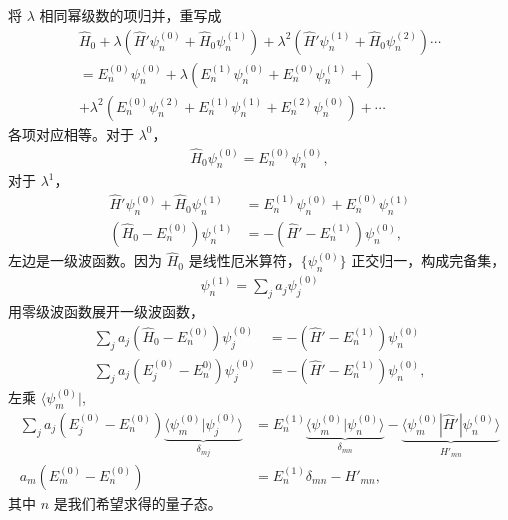 将 $\lambda$ 相同幂级数的项归并，重写成
\begin{multline}
    \hat H_0 + \lambda \left(
        \hat H' \psi_n^{(0)} + \hat H_0 \psi_n^{(1)}
    \right) + \lambda^2 \left(
        \hat H' \psi_n^{(1)} + \hat H_0 \psi_n^{(2)}
    \right) \cdots \\ = 
    E_n^{(0)} \psi_n^{(0)} + \lambda \left(
        E_n^{(1)} \psi_n^{(0)} + E_n^{(0)} \psi_n^{(1)} + 
    \right) 
    \\+ \lambda^2 \left(
        E_n^{(0)} \psi_n^{(2)} +E_n^{(1)} \psi_n^{(1)} + E_n^{(2)} \psi_n^{(0)}
    \right) + \cdots
\end{multline}
各项对应相等。对于 $\lambda^0$，
\begin{align}
    \hat H_0 \psi_n^{(0)} = E_n^{(0)} \psi_n^{(0)},
\end{align}
对于 $\lambda^1$，
\begin{align}
    \hat H' \psi_n^{(0)} + \hat H_0 \psi_n^{(1)} &= E_n^{(1)} \psi_n^{(0)} + E_n^{(0)} \psi_n^{(1)} \\
    (\hat H_0 - E_n^{(0)})\psi_n^{(1)}&= - (\hat H' - E_n^{(1)}) \psi_n^{(0)},
\end{align}
左边是一级波函数。因为 $\hat H_0$ 是线性厄米算符，$\{\psi_n^{(0)}\}$ 正交归一，构成完备集，
\begin{align}
    \psi_n^{(1)} = \sum_j a_j \psi_j^{(0)}
\end{align}
用零级波函数展开一级波函数，
\begin{align}
    \sum_j a_j (\hat H_0 - E_n^{(0)}) \psi_j^{(0)} &= - (\hat H' - E_n^{(1)}) \psi_n^{(0)}\\
    \sum_j a_j (E_j^{(0)} - E_n^{0)}) \psi_j^{(0)} &= - (\hat H' - E_n^{(1)}) \psi_n^{(0)},
\end{align}
左乘 $\langle \psi_m^{(0)}|$,
\begin{align}
    \sum_j a_j (E_j^{(0)} - E_n^{(0)}) 
    \underbrace{\langle \psi_m^{(0)} | \psi_j^{(0)} \rangle}_{\delta_{mj}}
    &= E_n^{(1)} 
    \underbrace{\langle \psi_m^{(0)} | \psi_n^{(0)} \rangle}_{\delta_{mn}}
    - 
    \underbrace{\langle \psi_m^{(0)} | \hat H' | \psi_n^{(0)} \rangle}_{H'_{mn}} \\
    a_m (E_m^{(0)} - E_n^{(0)}) &= E_n^{(1)} \delta_{mn} - H'_{mn}, 
\end{align}
其中 $n$ 是我们希望求得的量子态。


